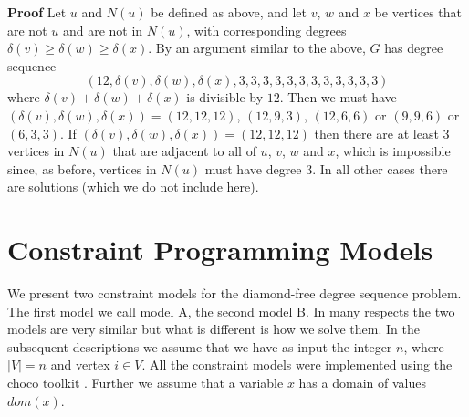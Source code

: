 \documentclass{l4proj}
\begin{document}
\vspace{.25cm}
{\bf Proof} Let $u$ and $N(u)$ be defined as above, and let $v$, $w$ and $x$ be vertices that are not $u$
 and are not in $N(u)$, with corresponding degrees $\delta(v)\geq \delta(w)\geq \delta(x)$. By an argument similar to the above, $G$ has
 degree sequence $$(12,\delta(v),\delta(w),\delta(x),3,3,3,3,3,3,3,3,3,3,3,3)$$  where  $\delta(v)+\delta(w)+\delta(x)$ is divisible by $12$. 
Then we must have
 $(\delta(v),\delta(w),\delta(x))= (12,12,12)$, $(12,9,3)$, $(12,6,6)$ or $(9,9,6)$ or $(6,3,3)$. 
If $(\delta(v),\delta(w),\delta(x))=(12,12,12)$ then there are at least $3$
vertices in $N(u)$ that are adjacent to all of $u$, $v$, $w$ and $x$, which is impossible since, as before,
vertices in $N(u)$ must have degree $3$. In all other cases there are solutions (which we do not include here).

\chapter{Constraint Programming Models}
\label{sec:models}
\vspace{-3mm}
We present two constraint models for the diamond-free degree sequence problem. The first model we call
model A, the second model B. In many respects the two models are very similar but what is different
is how we solve them. In the subsequent descriptions we assume that we
have as input the integer $n$, where $|V| = n$ and vertex $i \in V$. All the constraint models were
implemented using the choco toolkit \cite{JChoco}. Further we assume that a variable $x$ has a domain of values
$dom(x)$.
\end{document}
